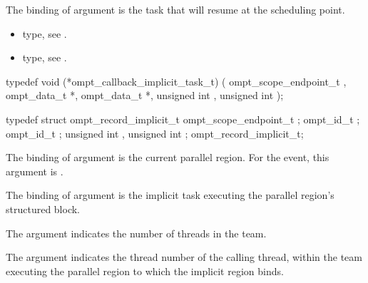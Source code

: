 The binding of argument  is the task that
will resume at the scheduling point.

\crossreferences
\begin{itemize}
\item {} type, see
.

\item {} type, see
.
\end{itemize}



\label{sec:ompt_callback_implicit_task_t}
\format

\begin{ccppspecific}
\begin{omptCallback}
typedef void (*ompt_callback_implicit_task_t) (
  ompt_scope_endpoint_t ,
  ompt_data_t *,
  ompt_data_t *,
  unsigned int ,
  unsigned int 
);
\end{omptCallback}
\end{ccppspecific}


\record

\begin{ccppspecific}
\begin{omptRecord}
typedef struct ompt_record_implicit_t {
  ompt_scope_endpoint_t ;
  ompt_id_t ;
  ompt_id_t ;
  unsigned int ,
  unsigned int ;
} ompt_record_implicit_t;
\end{omptRecord}
\end{ccppspecific}


\argdesc

\epdesc

The binding of argument  is the current
parallel region.
For the  event, this argument is .

The binding of argument  is the implicit task
executing the parallel region's structured block.

The argument  indicates the number of
threads in the team.

The argument  indicates
the thread number of the calling thread, within the team executing the parallel
region to which the implicit region binds.

